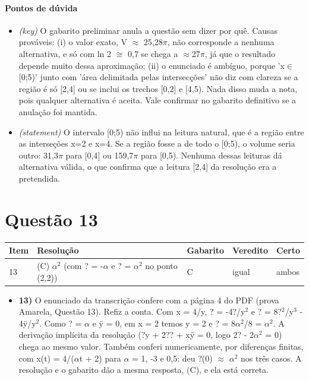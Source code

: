 \documentclass{article}%
\begin{document}
\paragraph{Pontos de dúvida}%
\begin{itemize}%
\item%
\textit{(key)} O gabarito preliminar anula a questão sem dizer por quê. Causas prováveis: (i) o valor exato, V $\approx$ 25,28$\pi$, não corresponde a nenhuma alternativa, e só com ln 2 $\cong$ 0,7 se chega a $\approx$27$\pi$, já que o resultado depende muito dessa aproximação; (ii) o enunciado é ambíguo, porque 'x$\in${[}0;5)' junto com 'área delimitada pelas intersecções' não diz com clareza se a região é só {[}2,4{]} ou se inclui os trechos {[}0,2{]} e {[}4,5). Nada disso muda a nota, pois qualquer alternativa é aceita. Vale confirmar no gabarito definitivo se a anulação foi mantida.%
\item%
\textit{(statement)} O intervalo {[}0;5) não influi na leitura natural, que é a região entre as interseções x=2 e x=4. Se a região fosse a de todo o {[}0;5), o volume seria outro: 31,3$\pi$ para {[}0,4{]} ou 159,7$\pi$ para {[}0,5). Nenhuma dessas leituras dá alternativa válida, o que confirma que a leitura {[}2,4{]} da resolução era a pretendida.%
\end{itemize}%
\section*{Questão 13}%
\begin{longtable}{@{}p{} p{} p{} p{} p{}@{}}\toprule Item & Resolução & Gabarito & Veredito & Certo \\ \midrule
13 & (C) $\alpha$$^2$ (com ? = -$\alpha$ e ? = $\alpha$$^2$ no ponto (2,2)) & C & igual & ambos \\
\bottomrule\end{longtable}%
\begin{itemize}%
\item%
\textbf{13)} O enunciado da transcrição confere com a página 4 do PDF (prova Amarela, Questão 13). Refiz a conta. Com x = 4/y, ? = -4?/y$^2$ e ? = 8?$^2$/y$^3$ - 4ÿ/y$^2$. Como ? = $\alpha$ e ÿ = 0, em x = 2 temos y = 2 e ? = 8$\alpha$$^2$/8 = $\alpha$$^2$. A derivação implícita da resolução (?y + 2?? + xÿ = 0, logo 2? - 2$\alpha$$^2$ = 0) chega ao mesmo valor. Também conferi numericamente, por diferenças finitas, com x(t) = 4/($\alpha$t + 2) para $\alpha$ = 1, -3 e 0,5: deu ?(0) $\approx$ $\alpha$$^2$ nos três casos. A resolução e o gabarito dão a mesma resposta, (C), e ela está correta.%
\end{itemize}%
\end{document}
